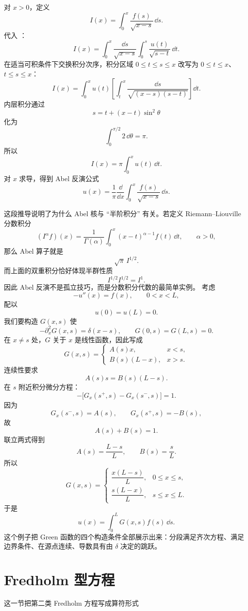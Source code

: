 对 $x>0$，定义
\[
I(x)=\int_0^x\frac{f(s)}{\sqrt{x-s}}\,\dd s.
\]
代入 ：
\[
I(x)=\int_0^x\frac{\dd s}{\sqrt{x-s}}
\int_0^s\frac{u(t)}{\sqrt{s-t}}\,\dd t.
\]
在适当可积条件下交换积分次序，积分区域 $0\le t\le s\le x$ 改写为 $0\le t\le x$、$t\le s\le x$：
\[
I(x)=\int_0^xu(t)
\left[
\int_t^x\frac{\dd s}{\sqrt{(x-s)(s-t)}}
\right]\dd t.
\]
内层积分通过
\[
s=t+(x-t)\sin^2\theta
\]
化为
\[
\int_0^{\pi/2}2\,\dd\theta=\pi.
\]
所以
\[
I(x)=\pi\int_0^xu(t)\,\dd t.
\]
对 $x$ 求导，得到 Abel 反演公式
\begin{equation*}{
u(x)=\frac1\pi\frac{\dd}{\dd x}
\int_0^x\frac{f(s)}{\sqrt{x-s}}\,\dd s
}.\end{equation*}

这段推导说明了为什么 Abel 核与 ``半阶积分'' 有关。若定义 Riemann--Liouville 分数积分
\[
(I^\alpha f)(x)
=\frac1{\Gamma(\alpha)}
\int_0^x(x-t)^{\alpha-1}f(t)\,\dd t,
\qquad \alpha>0,
\]
那么 Abel 算子就是
\[
\sqrt\pi\,I^{1/2}.
\]
而上面的双重积分恰好体现半群性质
\[
I^{1/2}I^{1/2}=I^1.
\]
因此 Abel 反演不是孤立技巧，而是分数积分代数的最简单实例。
考虑
\[
-u''(x)=f(x),
\qquad 0<x<L,
\]
配以
\[
u(0)=u(L)=0.
\]
我们要构造 $G(x,s)$ 使
\[
-\partial_x^2G(x,s)=\delta(x-s),
\qquad
G(0,s)=G(L,s)=0.
\]
在 $x\neq s$ 处，$G$ 关于 $x$ 是线性函数，因此写成
\[
G(x,s)=
\begin{cases}
A(s)x,&x<s,\\
B(s)(L-x),&x>s.
\end{cases}
\]
连续性要求
\[
A(s)s=B(s)(L-s).
\]
在 $s$ 附近积分微分方程：
\[
-\bigl[G_x(s^+,s)-G_x(s^-,s)\bigr]=1.
\]
因为
\[
G_x(s^-,s)=A(s),
\qquad
G_x(s^+,s)=-B(s),
\]
故
\[
A(s)+B(s)=1.
\]
联立两式得到
\[
A(s)=\frac{L-s}{L},
\qquad
B(s)=\frac{s}{L}.
\]
所以
\begin{equation*}{
G(x,s)=
\begin{cases}
\dfrac{x(L-s)}{L},&0\le x\le s,\\[5pt]
\dfrac{s(L-x)}{L},&s\le x\le L.
\end{cases}
}\end{equation*}
于是
\[
u(x)=\int_0^LG(x,s)f(s)\,\dd s.
\]
这个例子把 Green 函数的四个构造条件全部展示出来：分段满足齐次方程、满足边界条件、在源点连续、导数具有由 $\delta$ 决定的跳跃。

\section{Fredholm 型方程}
\label{sec:fredholm}

这一节把第二类 Fredholm 方程写成算符形式

